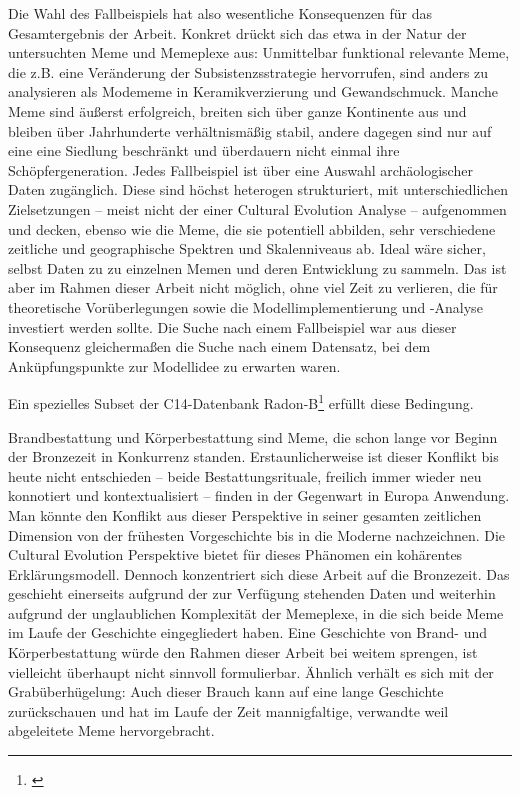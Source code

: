 \documentclass[openany,twoside,twocolumn]{book}
\let\rmarkdownfootnote\footnote%
\def\footnote{\protect\rmarkdownfootnote}
\begin{document}
Die Wahl des Fallbeispiels hat also wesentliche Konsequenzen für das
Gesamtergebnis der Arbeit. Konkret drückt sich das etwa in der Natur der
untersuchten Meme und Memeplexe aus: Unmittelbar funktional relevante
Meme, die z.B. eine Veränderung der Subsistenzsstrategie hervorrufen,
sind anders zu analysieren als Modememe in Keramikverzierung und
Gewandschmuck. Manche Meme sind äußerst erfolgreich, breiten sich über
ganze Kontinente aus und bleiben über Jahrhunderte verhältnismäßig
stabil, andere dagegen sind nur auf eine eine Siedlung beschränkt und
überdauern nicht einmal ihre Schöpfergeneration. Jedes Fallbeispiel ist
über eine Auswahl archäologischer Daten zugänglich. Diese sind höchst
heterogen strukturiert, mit unterschiedlichen Zielsetzungen -- meist
nicht der einer Cultural Evolution Analyse -- aufgenommen und decken,
ebenso wie die Meme, die sie potentiell abbilden, sehr verschiedene
zeitliche und geographische Spektren und Skalenniveaus ab. Ideal wäre
sicher, selbst Daten zu zu einzelnen Memen und deren Entwicklung zu
sammeln. Das ist aber im Rahmen dieser Arbeit nicht möglich, ohne viel
Zeit zu verlieren, die für theoretische Vorüberlegungen sowie die
Modellimplementierung und -Analyse investiert werden sollte. Die Suche
nach einem Fallbeispiel war aus dieser Konsequenz gleichermaßen die
Suche nach einem Datensatz, bei dem Anküpfungspunkte zur Modellidee zu
erwarten waren.

Ein spezielles Subset der C14-Datenbank Radon-B\footnote{\textcite{jutta_kneisel_radon-b_2013}}
erfüllt diese Bedingung.

Brandbestattung und Körperbestattung sind Meme, die schon lange vor
Beginn der Bronzezeit in Konkurrenz standen. Erstaunlicherweise ist
dieser Konflikt bis heute nicht entschieden -- beide Bestattungsrituale,
freilich immer wieder neu konnotiert und kontextualisiert -- finden in
der Gegenwart in Europa Anwendung. Man könnte den Konflikt aus dieser
Perspektive in seiner gesamten zeitlichen Dimension von der frühesten
Vorgeschichte bis in die Moderne nachzeichnen. Die Cultural Evolution
Perspektive bietet für dieses Phänomen ein kohärentes Erklärungsmodell.
Dennoch konzentriert sich diese Arbeit auf die Bronzezeit. Das geschieht
einerseits aufgrund der zur Verfügung stehenden Daten und weiterhin
aufgrund der unglaublichen Komplexität der Memeplexe, in die sich beide
Meme im Laufe der Geschichte eingegliedert haben. Eine Geschichte von
Brand- und Körperbestattung würde den Rahmen dieser Arbeit bei weitem
sprengen, ist vielleicht überhaupt nicht sinnvoll formulierbar. Ähnlich
verhält es sich mit der Grabüberhügelung: Auch dieser Brauch kann auf
eine lange Geschichte zurückschauen und hat im Laufe der Zeit
mannigfaltige, verwandte weil abgeleitete Meme hervorgebracht.
\end{document}
